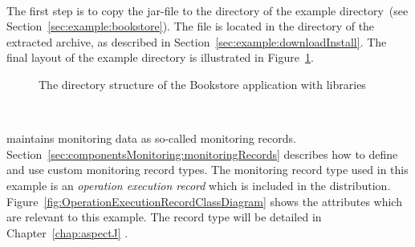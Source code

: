 \

\noindent The first step is to copy the \Kieker{} jar-file \file{\mainJarEMF} to the  directory of the example directory~(see Section~\ref{sec:example:bookstore}). The file is located in the  directory of the extracted \Kieker{} archive, as described in Section~\ref{sec:example:downloadInstall}. %
The final layout of the example directory is illustrated in Figure~\ref{fig:KiekerBookstoreExample}.

\begin{figure}[H]
\begin{graybox}
\end{graybox}
\caption{The directory structure of the Bookstore application with \Kieker{} libraries}
\label{fig:KiekerBookstoreExample}
\end{figure}


\quad\

\noindent \Kieker{} maintains monitoring data as  so-called monitoring records. %
Section~\ref{sec:componentsMonitoring:monitoringRecords} describes how to define and use custom monitoring record types. %
The monitoring record type used in this example is an \textit{operation execution record} which %
is included in the \Kieker{} distribution. %
Figure~\ref{fig:OperationExecutionRecordClassDiagram} shows the %
attributes which  are relevant to this example. %
The record type will be detailed in Chapter~\ref{chap:aspectJ} .

